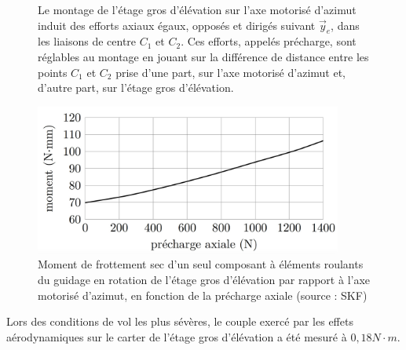 \begin{figure}[!htb]
\begin{center}
\begin{minipage}{0.45\textwidth}

Le montage de l'étage gros d'élévation sur l'axe motorisé
d'azimut induit des efforts axiaux égaux, opposés
et dirigés suivant $\overrightarrow{y}_e$, dans les liaisons de centre
$C_1$ et $C_2$. Ces efforts, appelés précharge, sont réglables
au montage en jouant sur la différence de distance
entre les points $C_1$ et $C_2$ prise d'une part, sur
l'axe motorisé d'azimut et, d'autre part, sur l'étage
gros d'élévation.
\end{minipage}
\begin{minipage}{0.45\textwidth}
\begin{center}
\includegraphics[width=0.9\textwidth]{images/figure11.jpg}
\caption{Moment de frottement sec d'un seul composant
à éléments roulants du guidage en rotation de l'étage
gros d'élévation par rapport à l'axe motorisé d'azimut, en
fonction de la précharge axiale (source : SKF)\label{fig11}}
\end{center}
\end{minipage}
\end{center}
\end{figure}
\FloatBarrier

Lors des conditions de vol les plus sévères, le couple exercé par les effets aérodynamiques sur le carter de l'étage
gros d'élévation a été mesuré à $0,18 N\cdot m$.


